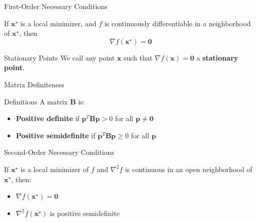 \documentclass[aspectratio=1610]{beamer}
\begin{document}
\begin{frame}{First-Order Necessary Conditions}
  \begin{theorem}
    If $\mathbf{x}^\star$ is a local minimizer, and $f$ is continuously differentiable in a neighborhood of $\mathbf{x}^\star$, then 
    $$\nabla f(\mathbf{x}^\star) = \mathbf{0}$$
  \end{theorem}
  
  \vspace{0.5cm}
  \begin{block}{Stationary Points}
    We call any point $\mathbf{x}$ such that $\nabla f(\mathbf{x}) = \mathbf{0}$ a \textbf{stationary point}.
  \end{block}
\end{frame}

\begin{frame}{Matrix Definiteness}
  \begin{block}{Definitions}
    A matrix $\mathbf{B}$ is:
    \begin{itemize}
      \item \textbf{Positive definite} if $\mathbf{p}^T \mathbf{B} \mathbf{p} > 0$ for all $\mathbf{p} \neq \mathbf{0}$
      \item \textbf{Positive semidefinite} if $\mathbf{p}^T \mathbf{B} \mathbf{p} \geq 0$ for all $\mathbf{p}$
    \end{itemize}
  \end{block}
\end{frame}

\begin{frame}{Second-Order Necessary Conditions}
  \begin{theorem}
    If $\mathbf{x}^\star$ is a local minimizer of $f$ and $\nabla^2 f$ is continuous in an open neighborhood of $\mathbf{x}^\star$, then:
    \begin{itemize}
      \item $\nabla f(\mathbf{x}^\star) = \mathbf{0}$
      \item $\nabla^2 f(\mathbf{x}^\star)$ is positive semidefinite
    \end{itemize}
  \end{theorem}
\end{frame}
\end{document}
